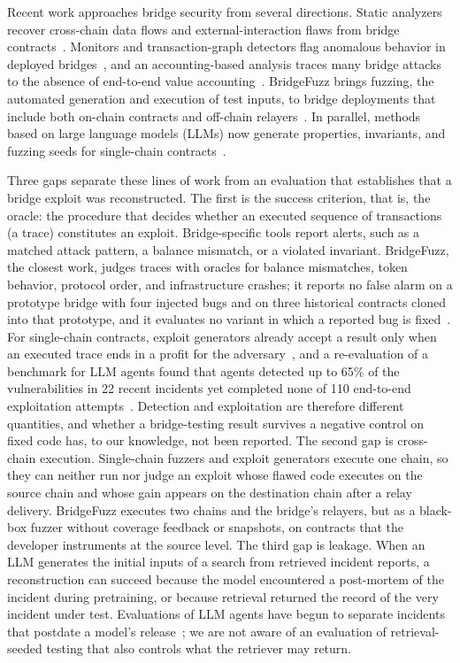 \documentclass[a4paper]{cas-sc}
\begin{document}
Recent work approaches bridge security from several directions. Static analyzers recover cross-chain data flows and external-interaction flaws from bridge contracts~\citep{liao2024smartaxe, zhou2025bridgeguard}. Monitors and transaction-graph detectors flag anomalous behavior in deployed bridges~\citep{augusto2025xchainwatcher, wu2025safeguarding, lin2025connector}, and an accounting-based analysis traces many bridge attacks to the absence of end-to-end value accounting~\citep{liu2024montecrypto}. BridgeFuzz brings fuzzing, the automated generation and execution of test inputs, to bridge deployments that include both on-chain contracts and off-chain relayers~\citep{winkler2026bridgefuzz}. In parallel, methods based on large language models (LLMs) now generate properties, invariants, and fuzzing seeds for single-chain contracts~\citep{liu2025propertygpt, wang2024smartinv, gai2026llama}.

Three gaps separate these lines of work from an evaluation that establishes that a bridge exploit was reconstructed. The first is the success criterion, that is, the oracle: the procedure that decides whether an executed sequence of transactions (a trace) constitutes an exploit. Bridge-specific tools report alerts, such as a matched attack pattern, a balance mismatch, or a violated invariant. BridgeFuzz, the closest work, judges traces with oracles for balance mismatches, token behavior, protocol order, and infrastructure crashes; it reports no false alarm on a prototype bridge with four injected bugs and on three historical contracts cloned into that prototype, and it evaluates no variant in which a reported bug is fixed~\citep{winkler2026bridgefuzz}. For single-chain contracts, exploit generators already accept a result only when an executed trace ends in a profit for the adversary~\citep{gervais2025a1, zhang2026v2e}, and a re-evaluation of a benchmark for LLM agents found that agents detected up to 65\% of the vulnerabilities in 22 recent incidents yet completed none of 110 end-to-end exploitation attempts~\citep{peng2026reevmbench}. Detection and exploitation are therefore different quantities, and whether a bridge-testing result survives a negative control on fixed code has, to our knowledge, not been reported. The second gap is cross-chain execution. Single-chain fuzzers and exploit generators execute one chain, so they can neither run nor judge an exploit whose flawed code executes on the source chain and whose gain appears on the destination chain after a relay delivery. BridgeFuzz executes two chains and the bridge's relayers, but as a black-box fuzzer without coverage feedback or snapshots, on contracts that the developer instruments at the source level. The third gap is leakage. When an LLM generates the initial inputs of a search from retrieved incident reports, a reconstruction can succeed because the model encountered a post-mortem of the incident during pretraining, or because retrieval returned the record of the very incident under test. Evaluations of LLM agents have begun to separate incidents that postdate a model's release~\citep{peng2026reevmbench}; we are not aware of an evaluation of retrieval-seeded testing that also controls what the retriever may return.
\end{document}
